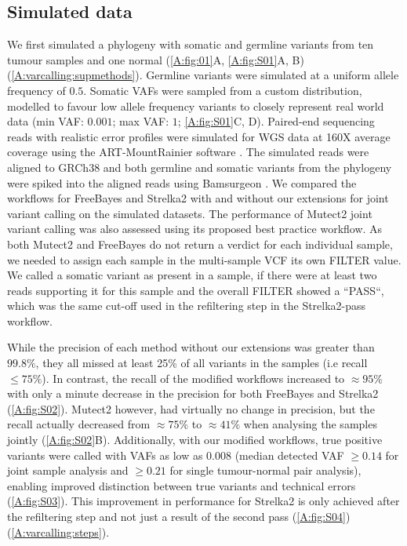\subsection{Simulated data}
We first simulated a phylogeny with somatic and germline variants from ten tumour samples and one normal (\autoref{A:fig:01}A, \autoref{A:fig:S01}A, B) (\autoref{A:varcalling:supmethods}). Germline variants were simulated at a uniform allele frequency of $0.5$. Somatic VAFs were sampled from a custom distribution, modelled to favour low allele frequency variants to closely represent real world data (min VAF: $0.001$; max VAF: $1$; \autoref{A:fig:S01}C, D). Paired-end sequencing reads with realistic error profiles were simulated for WGS data at 160X average coverage using the ART-MountRainier software \parencite{Huang2011}. The simulated reads were aligned to GRCh38 and both germline and somatic variants from the phylogeny were spiked into the aligned reads using Bamsurgeon \parencite{Ewing2015}. We compared the workflows for FreeBayes and Strelka2 with and without our extensions for joint variant calling on the simulated datasets. The performance of Mutect2 joint variant calling was also assessed using its proposed best practice workflow. As both Mutect2 and FreeBayes do not return a verdict for each individual sample, we needed to assign each sample in the multi-sample VCF its own FILTER value. We called a somatic variant as present in a sample, if there were at least two reads supporting it for this sample and the overall FILTER showed a ``PASS``, which was the same cut-off used in the refiltering step in the Strelka2-pass workflow.

While the precision of each method without our extensions was greater than $99.8\%$, they all missed at least 25\% of all variants in the samples (i.e recall $\leq 75\%$). In contrast, the recall of the modified workflows increased to $\approx 95\%$ with only a minute decrease in the precision for both FreeBayes and Strelka2 (\autoref{A:fig:S02}). Mutect2 however, had virtually no change in precision, but the recall actually decreased from $\approx 75\%$ to $\approx 41\%$ when analysing the samples jointly (\autoref{A:fig:S02}B). Additionally, with our modified workflows, true positive variants were called with VAFs as low as 0.008 (median detected VAF $\geq 0.14$ for joint sample analysis and $\geq 0.21$ for single tumour-normal pair analysis), enabling improved distinction between true variants and technical errors (\autoref{A:fig:S03}). This improvement in performance for Strelka2 is only achieved after the refiltering step and not just a result of the second pass (\autoref{A:fig:S04}) (\autoref{A:varcalling:steps}).

